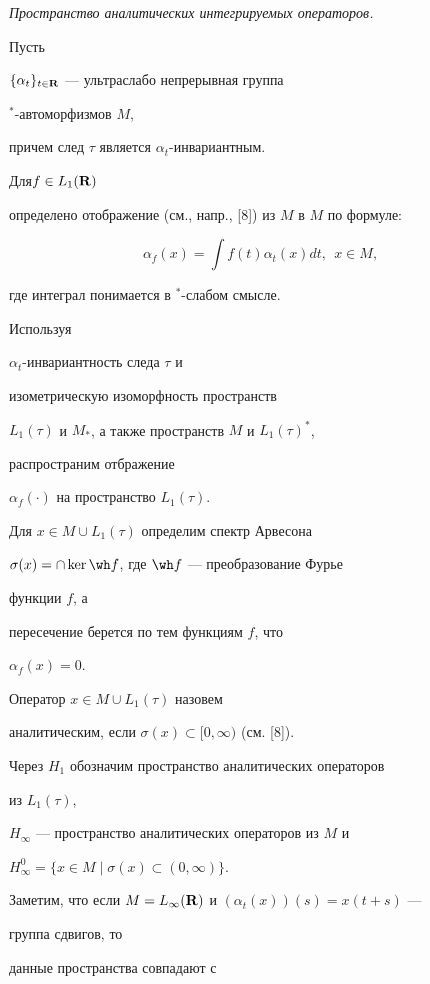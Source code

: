 {\it Пространство аналитических интегрируемых операторов.}


Пусть


$\{\alpha_{t}\}_{t\in {\bold R}}$ --- ультраслабо непрерывная группа


$^{*}$-автоморфизмов $M$,


причем след $\tau$ является $\alpha_{t}$-инвариантным.


Для\linebreak $f\in L_{1}({\bold R})$


определено отображение (см., напр., [8]) из $M$ в $M$ по формуле:


$$


\alpha_{f}(x)=\int f(t)\alpha_{t}(x)dt,\ \ x\in M,


$$


где интеграл понимается в $^{*}$-слабом смысле.


Используя


$\alpha_{t}$-инвариантность следа $\tau$ и


изометрическую изоморфность пространств


$L_{1}(\tau)$ и $M_{*}$, а также пространств $M$ и $L_{1}(\tau)^{*}$,


распространим отбражение


$\alpha_{f}(\cdot)$ на пространство $L_{1}(\tau)$.


Для $x\in M\cup L_{1}(\tau)$ определим спектр Арвесона


$\sigma(x)=\cap \ker\wh f$, где $\wh f$ --- преобразование Фурье


функции $f$, а


пересечение берется по тем функциям $f$, что


$\alpha_{f}(x)=0$.


Оператор $x\in M\cup L_{1}(\tau)$ назовем


аналитическим, если $\sigma(x)\subset [0,\infty)$ (см. [8]).


Через $H_{1}$ обозначим пространство аналитических операторов


из $L_{1}(\tau)$,


$H_{\infty}$ --- пространство аналитических операторов из $M$ и


$H_{\infty}^{0}= \{ x\in M\mid \sigma(x)\subset (0,\infty) \}$.


Заметим, что если $M=L_{\infty}({\bold R})$ и $(\alpha_{t}(x))(s)=x(t+s)$ ---


группа сдвигов, то


данные пространства совпадают с


